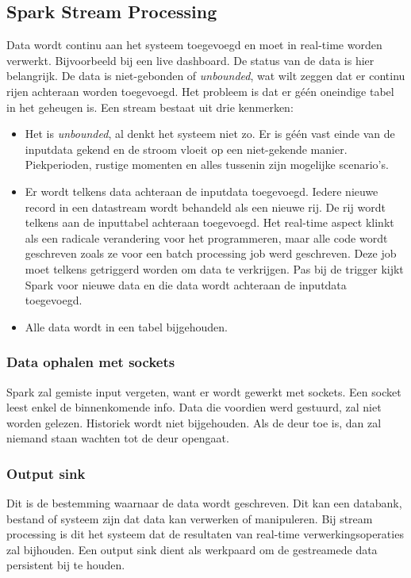 \documentclass[a4paper,10pt,twoside]{report}
\begin{document}
\subsection{Spark Stream Processing}

Data wordt continu aan het systeem toegevoegd en moet in real-time worden verwerkt. Bijvoorbeeld bij een live dashboard. De status van de data is hier belangrijk. De data is niet-gebonden of \textit{unbounded}, wat wilt zeggen dat er continu rijen achteraan worden toegevoegd. Het probleem is dat er géén oneindige tabel in het geheugen is. Een stream bestaat uit drie kenmerken:

\begin{itemize}
	\item Het is \textit{unbounded}, al denkt het systeem niet zo. Er is géén vast einde van de inputdata gekend en de stroom vloeit op een niet-gekende manier. Piekperioden, rustige momenten en alles tussenin zijn mogelijke scenario's.
	\item Er wordt telkens data achteraan de inputdata toegevoegd. Iedere nieuwe record in een datastream wordt behandeld als een nieuwe rij. De rij wordt telkens aan de inputtabel achteraan toegevoegd. Het real-time aspect klinkt als een radicale verandering voor het programmeren, maar alle code wordt geschreven zoals ze voor een batch processing job werd geschreven. Deze job moet telkens getriggerd worden om data te verkrijgen. Pas bij de trigger kijkt Spark voor nieuwe data en die data wordt achteraan de inputdata toegevoegd.
	\item Alle data wordt in een tabel bijgehouden.
\end{itemize}


\subsubsection{Data ophalen met sockets}

Spark zal gemiste input vergeten, want er wordt gewerkt met sockets. Een socket leest enkel de binnenkomende info. Data die voordien werd gestuurd, zal niet worden gelezen. Historiek wordt niet bijgehouden. Als de deur toe is, dan zal niemand staan wachten tot de deur opengaat. 

\subsubsection{Output sink}

Dit is de bestemming waarnaar de data wordt geschreven. Dit kan een databank, bestand of systeem zijn dat data kan verwerken of manipuleren. Bij stream processing is dit het systeem dat de resultaten van real-time verwerkingsoperaties zal bijhouden. Een output sink dient als werkpaard om de gestreamede data persistent bij te houden.
\end{document}
